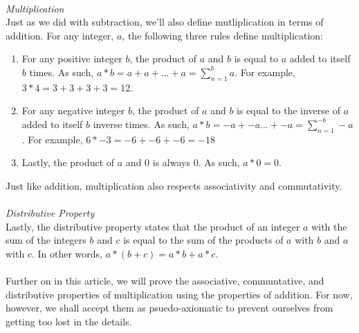 \documentclass[a4paper,12pt]{article}
\begin{document}
\\
\textit{Multiplication}\\
Just as we did with subtraction, we'll also define mutliplication in terms of addition. For any integer, $a$, the following three rules define multiplication:
\begin{enumerate}
\item For any positive integer $b$, the product of $a$ and $b$ is equal to $a$ added to itself $b$ times. As such, $a * b = a + a + ... + a =\sum_{n=1}^{b}a$. For example, $3 * 4 = 3 + 3 + 3 + 3 = 12$.
\item For any negative integer $b$, the product of $a$ and $b$ is equal to the inverse of $a$ added to itself $b$ inverse times. As such, $a * b = -a + -a ... + -a = \sum_{n=1}^{-b}-a$. For example, $6 * -3 = -6 + -6 + -6 = -18$
\item Lastly, the product of $a$ and $0$ is always $0$. As such, $a*0 = 0$.
\end{enumerate}
Just like addition, multiplication also respects associativity and commutativity.\\  
\\
\textit{Distributive Property}\\
Lastly, the distributive property states that the product of an integer $a$ with the sum of the integers $b$ and $c$ is equal to the sum of the products of $a$ with $b$ and $a$ with $c$. In other words, $a*(b + c) = a*b + a*c$.\\ 
\\
Further on in this article, we will prove the associative, communtative, and distributive properties of multiplication using the properties of addition. For now, however, we shall accept them as psuedo-axiomatic to prevent ourselves from getting too lost in the details.
\end{document}
